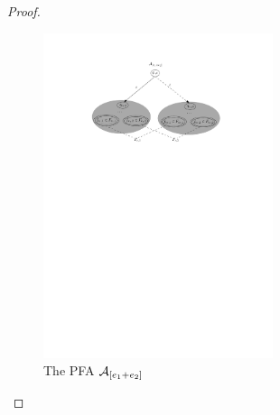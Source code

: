 \begin{proof}
\begin{itemize}
            \begin{figure}[ht]
                \centering
                \includegraphics[width = 0.6\textwidth]{reg2pfa-1.pdf}
                \caption{The PFA $\mathcal{A}_{[e_1+e_2]}$}
                \label{fig-reg2pfa-1}
            \end{figure}  


\end{itemize}
\end{proof}
